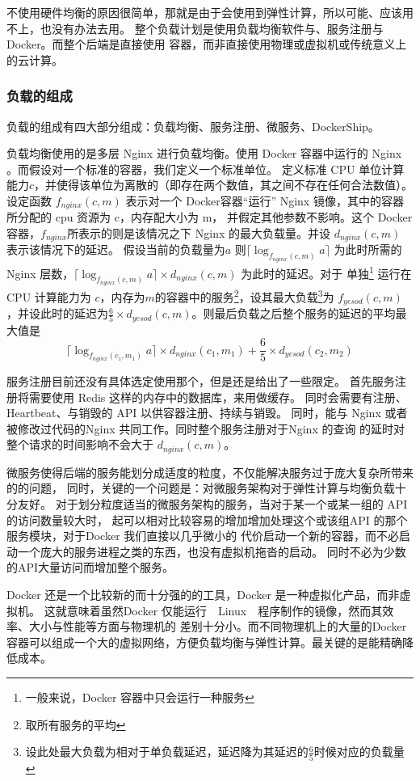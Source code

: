不使用硬件均衡的原因很简单，那就是由于会使用到弹性计算，所以可能、应该用不上，也没有办法去用。
整个负载计划是使用负载均衡软件与、服务注册与Docker。而整个后端是直接使用 容器，而非直接使用物理或虚拟机或传统意义上的云计算。
\subsubsection{负载的组成}
负载的组成有四大部分组成：负载均衡、服务注册、微服务、DockerShip。

负载均衡使用的是多层 Nginx 进行负载均衡。使用 Docker 容器中运行的 Nginx 。而假设对一个标准的容器，我们定义一个标准单位。
定义标准 CPU 单位计算能力$c$，并使得该单位为离散的（即存在两个数值，其之间不存在任何合法数值）。设定函数
$f_{nginx}(c,m)$ 表示对一个 Docker容器“运行” Nginx 镜像，其中的容器所分配的 cpu 资源为 c，内存配大小为 m，
并假定其他参数不影响。这个 Docker 容器，$f_{nginx}$所表示的则是该情况之下 Nginx 的最大负载量。并设 $d_{nginx}(c,m)$ 表示该情况下的延迟。
假设当前的负载量为$a$ 则$\lceil \log_{f_{nginx}(c,m)}a\rceil$ 为此时所需的 Nginx 层数，$\lceil \log_{f_{nginx}(c,m)}a\rceil \times d_{nginx}(c,m)$ 为此时的延迟。对于 单独\footnote{一般来说，Docker 容器中只会运行一种服务} 
运行在 CPU 计算能力为 $c$，内存为$m$的容器中的服务\footnote{取所有服务的平均}，设其最大负载\footnote{设此处最大负载为相对于单负载延迟，延迟降为其延迟的$\frac{6}{5}$时候对应的负载量}为
 $f_{yesod}(c,m)$，并设此时的延迟为$\frac{6}{5} \times d_{yesod}(c,m)$。则最后负载之后整个服务的延迟的平均最大值是$$\lceil \log_{f_{nginx}(c_1,m_1)}a\rceil \times d_{nginx}(c_1,m_1)+\frac{6}{5} \times d_{yesod}(c_2,m_2)$$

服务注册目前还没有具体选定使用那个，但是还是给出了一些限定。
首先服务注册将需要使用 Redis 这样的内存中的数据库，来用做缓存。
同时会需要有注册、Heartbeat、与销毁的 API 以供容器注册、持续与销毁。
同时，能与 Nginx 或者被修改过代码的Nginx 共同工作。同时整个服务注册对于Nginx 的查询
的延时对整个请求的时间影响不会大于 $d_{nginx}(c,m)$。

微服务使得后端的服务能划分成适度的粒度，不仅能解决服务过于庞大复杂所带来的的问题，
同时，关键的一个问题是：对微服务架构对于弹性计算与均衡负载十分友好。
对于划分粒度适当的微服务架构的服务，当对于某一个或某一组的 API 的访问数量较大时，
起可以相对比较容易的增加增加处理这个或该组API 的那个服务模块，对于Docker 我们直接以几乎微小的
代价启动一个新的容器，而不必启动一个庞大的服务进程之类的东西，也没有虚拟机拖沓的启动。
同时不必为少数的API大量访问而增加整个服务。

Docker 还是一个比较新的而十分强的的工具，Docker 是一种虚拟化产品，而非虚拟机。
这就意味着虽然Docker 仅能运行　Linux　程序制作的镜像，然而其效率、大小与性能等方面与物理机的
差别十分小。而不同物理机上的大量的Docker容器可以组成一个大的虚拟网络，方便负载均衡与弹性计算。最关键的是能精确降低成本。

